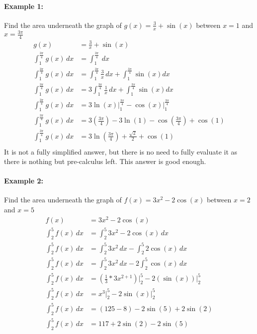 \documentclass[../revisedmain.tex]{subfiles}
\begin{document}
\paragraph{Example 1:} Find the area underneath the graph of $g(x)=\displaystyle\frac{3}{x}+\sin(x)$ between $x=1$ and $x=\displaystyle\frac{3\pi}{4}$
\begin{equation}
	\begin{split}
		g(x)&=\frac{3}{x}+\sin(x)\\
		\int_{1}^{\frac{3\pi}{4}}g(x)\, dx&=\int_{1}^{\frac{3\pi}{4}}\, dx\\
		\int_{1}^{\frac{3\pi}{4}}g(x)\, dx&=\int_{1}^{\frac{3\pi}{4}}\frac{3}{x}\, dx+\int_{1}^{\frac{3\pi}{4}} \sin(x)dx\\
		\int_{1}^{\frac{3\pi}{4}}g(x)\, dx&=3\int_{1}^{\frac{3\pi}{4}}\frac{1}{x}\, dx+\int_{1}^{\frac{3\pi}{4}}\sin(x)dx\\
		\int_{1}^{\frac{3\pi}{4}}g(x)\, dx&=3\ln(x)\Big|_{1}^{\frac{3\pi}{4}}-\cos(x)\Big|_{1}^{\frac{3\pi}{4}}\\
		\int_{1}^{\frac{3\pi}{4}}g(x)\, dx&=3\left( \frac{3\pi}{4} \right)-3\ln(1)-\cos
		\left( \frac{3\pi}{4} \right)+\cos(1)\\
		\int_{1}^{\frac{3\pi}{4}}g(x)\, dx&=3\ln\left(\frac{3\pi}{4}\right)+\frac{\sqrt{2}}{2}+\cos(1)\\
	\end{split}
\end{equation}It is not a fully simplified answer, but there is no need to fully evaluate it as there is nothing but pre-calculus left. This answer is good enough.\\
\paragraph{Example 2:} Find the area underneath the graph of $f(x)=3x^2-2\cos(x)$ between $x=2$ and $x=5$
\begin{equation}
	\begin{split}
		f(x)&=3x^2-2\cos(x)\\
		\int_{2}^{5}f(x)\, dx&=\int_{2}^{5}3x^2-2\cos(x)\, dx\\
		\int_{2}^{5}f(x)\, dx&=\int_{2}^{5}3x^2\, dx - \int_{2}^{5}2\cos(x)\, dx\\
		\int_{2}^{5}f(x)\, dx&=\int_{2}^{5}3x^2\, dx - 2\int_{2}^{5}\cos(x)\, dx\\
		\int_{2}^{5}f(x)\, dx&=\left(\frac{1}{3}*3x^{2+1}\right)\Big|_{2}^{5} - 2(\sin(x))\Big|_{2}^{5}\\
		\int_{2}^{5}f(x)\, dx&=x^3\Big|_{2}^{5} - 2\sin(x)\Big|_{2}^{5}\\
		\int_{2}^{5}f(x)\, dx&=(125-8) - 2\sin(5) + 2\sin(2)\\
		\int_{2}^{5}f(x)\, dx&=117+2\sin(2)-2\sin(5)\\
	\end{split}
\end{equation}
\end{document}
